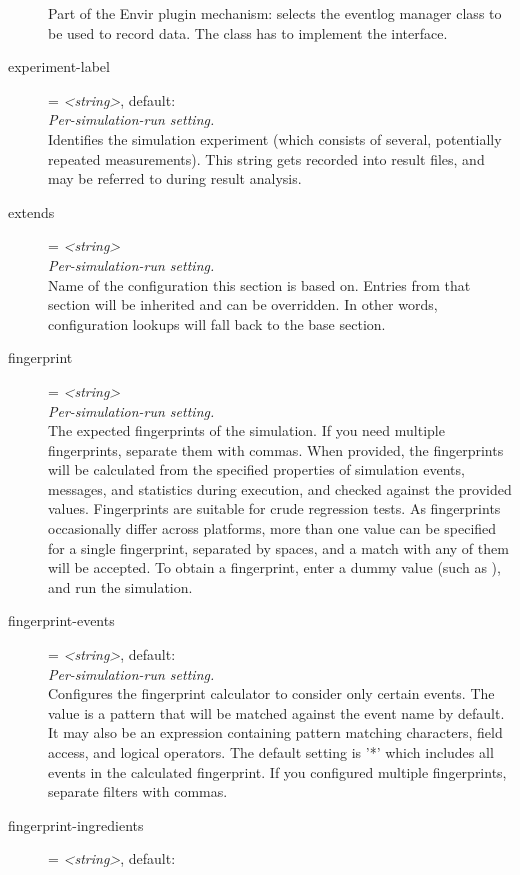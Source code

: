 \begin{description}
    Part of the Envir plugin mechanism: selects the eventlog manager class to
    be used to record data. The class has to implement the
     interface.
\item[experiment-label] = \textit{<string>}, default: \\
    \textit{Per-simulation-run setting.}\\
    Identifies the simulation experiment (which consists of several,
    potentially repeated measurements). This string gets recorded into result
    files, and may be referred to during result analysis.
\item[extends] = \textit{<string>}\\
    \textit{Per-simulation-run setting.}\\
    Name of the configuration this section is based on. Entries from that
    section will be inherited and can be overridden. In other words,
    configuration lookups will fall back to the base section.
\item[fingerprint] = \textit{<string>}\\
    \textit{Per-simulation-run setting.}\\
    The expected fingerprints of the simulation. If you need multiple
    fingerprints, separate them with commas. When provided, the fingerprints
    will be calculated from the specified properties of simulation events,
    messages, and statistics during execution, and checked against the provided
    values. Fingerprints are suitable for crude regression tests. As
    fingerprints occasionally differ across platforms, more than one value can
    be specified for a single fingerprint, separated by spaces, and a match
    with any of them will be accepted. To obtain a fingerprint, enter a dummy
    value (such as ), and run the simulation.
\item[fingerprint-events] = \textit{<string>}, default: \ttt{*}\\
    \textit{Per-simulation-run setting.}\\
    Configures the fingerprint calculator to consider only certain events. The
    value is a pattern that will be matched against the event name by default.
    It may also be an expression containing pattern matching characters, field
    access, and logical operators. The default setting is '*' which includes
    all events in the calculated fingerprint. If you configured multiple
    fingerprints, separate filters with commas.
\item[fingerprint-ingredients] = \textit{<string>}, default: \\

\end{description}

